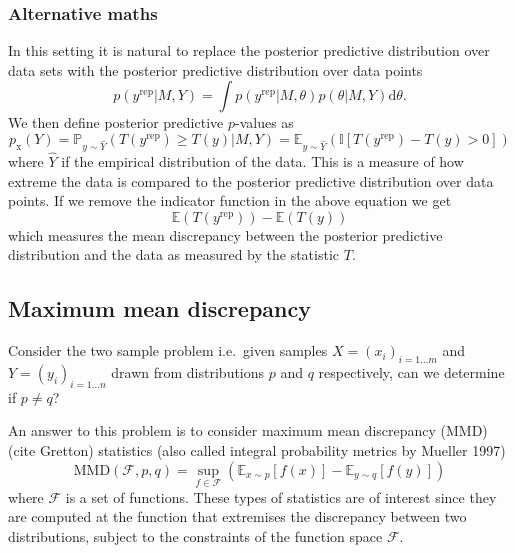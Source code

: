 \documentclass{article} %
\def\ie{i.e.\ }
\begin{document}
\subsubsection{Alternative maths}

In this setting it is natural to replace the posterior predictive distribution over data sets with the posterior predictive distribution over data points
\begin{equation}
p(y^\textrm{rep}|M,Y) = \int p(y^\textrm{rep}|M,\theta)p(\theta|M,Y)\mathrm{d}\theta.
\end{equation}
We then define posterior predictive $p$-values as
\begin{equation}
  p_\textrm{x}(Y) = \mathbb{P}_{y\sim \hat{Y}}(T(y^\textrm{rep})\geq T(y)|M,Y) = \mathbb{E}_{y\sim \hat{Y}}(\mathbb{I}[T(y^\textrm{rep}) - T(y) > 0])
\end{equation}
where $\hat{Y}$ if the empirical distribution of the data.
This is a measure of how extreme the data is compared to the posterior predictive distribution over data points.
If we remove the indicator function in the above equation we get
\begin{equation}
  \mathbb{E}(T(y^\textrm{rep})) - \mathbb{E}(T(y))
\end{equation}
which measures the mean discrepancy between the posterior predictive distribution and the data as measured by the statistic $T$.

\subsection{Maximum mean discrepancy}

Consider the two sample problem \ie given samples $X = (x_i)_{i=1\ldots m}$ and $Y = (y_i)_{i=1\ldots n}$ drawn \iid from distributions $p$ and $q$ respectively, can we determine if $p \neq q$?

An answer to this problem is to consider maximum mean discrepancy (MMD) (cite Gretton) statistics (also called integral probability metrics by Mueller 1997)
\begin{equation}
\textrm{MMD}(\mathcal{F},p,q) = \sup_{f \in \mathcal{F}}(\mathbb{E}_{x\sim p}[f(x)] - \mathbb{E}_{y\sim q}[f(y)])
\end{equation}
where $\mathcal{F}$ is a set of functions.
These types of statistics are of interest since they are computed at the function that extremises the discrepancy between two distributions, subject to the constraints of the function space $\mathcal{F}$.
\end{document}

